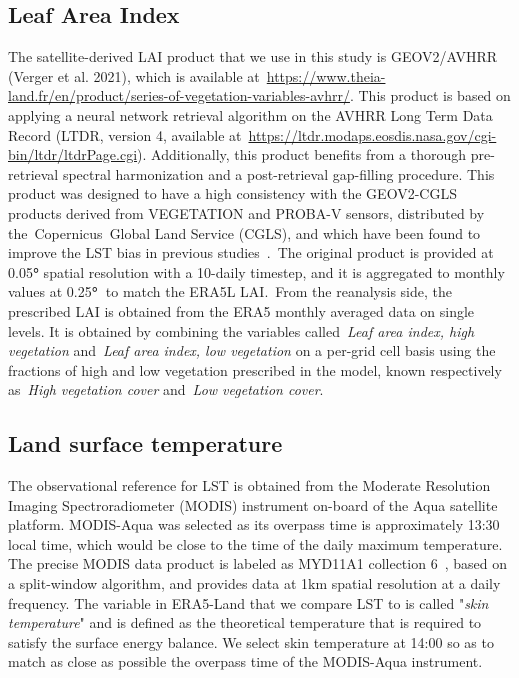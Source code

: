 \documentclass[gmd, manuscript]{copernicus}
\begin{document}
\subsection{Leaf Area Index}

The satellite-derived LAI product that we use in this study is
GEOV2/AVHRR (Verger et al. 2021), which is available at~\url{https://www.theia-land.fr/en/product/series-of-vegetation-variables-avhrr/}. This product is based on applying a
neural network retrieval algorithm on the AVHRR Long Term Data Record
(LTDR, version 4, available
at~\url{https://ltdr.modaps.eosdis.nasa.gov/cgi-bin/ltdr/ltdrPage.cgi}).
Additionally, this product benefits from a thorough pre-retrieval
spectral harmonization and a post-retrieval gap-filling procedure. This
product was designed to have a high consistency with the GEOV2-CGLS
products derived from VEGETATION and PROBA-V sensors, distributed by
the~Copernicus~Global Land Service (CGLS), and which have been found to
improve the LST bias in previous studies~\citep{Nogueira_2020,Nogueira_2021}.~The
original product is provided at 0.05\textbf{°} spatial resolution with a
10-daily timestep, and it is aggregated to monthly values at
0.25\textbf{°~}to match the ERA5L LAI.~{From the reanalysis side, the
prescribed LAI is obtained from the ERA5 monthly averaged data on single
levels.} It is obtained by combining the variables called~\emph{{Leaf}
area index, high vegetation} and~\emph{Leaf area index, low vegetation}
on a per-grid cell basis using the fractions of high and low vegetation
prescribed in the model, known respectively as~\emph{High vegetation
cover} and~\emph{Low vegetation cover}.~


\subsection{Land surface temperature}

The observational reference for LST is obtained from the Moderate
Resolution Imaging Spectroradiometer (MODIS) instrument on-board of the
Aqua satellite platform. MODIS-Aqua was selected as its overpass time is
approximately 13:30 local time, which would be close to the time of the
daily maximum temperature. The precise MODIS data product is labeled as
MYD11A1 collection 6~\citep{Wan_2015}, based on a split-window
algorithm, and provides data at 1km spatial resolution at a daily
frequency. The variable in ERA5-Land that we compare LST to is called
"\emph{skin temperature}" and is defined as the theoretical temperature
that is required to satisfy the surface energy balance. We select skin
temperature at 14:00 so as to match as close as possible the overpass
time of the MODIS-Aqua instrument.~
\end{document}
